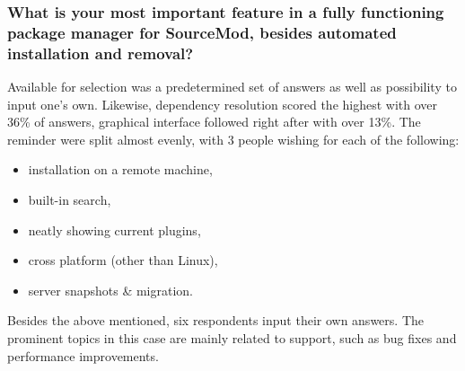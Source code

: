 \subsubsection{What is your most important feature in a fully functioning package manager for SourceMod, besides automated installation and removal?}

Available for selection was a predetermined set of answers as well as possibility to input one's own.
Likewise, dependency resolution scored the highest with over 36\% of answers, graphical interface followed right after with over 13\%.
The reminder were split almost evenly, with 3 people wishing for each of the following:

\begin{itemize}
    \item installation on a remote machine,
    \item built-in search,
    \item neatly showing current plugins,
    \item cross platform (other than Linux),
    \item server snapshots \& migration.
\end{itemize}

Besides the above mentioned, six respondents input their own answers.
The prominent topics in this case are mainly related to support, such as bug fixes and performance improvements.
%
%
%
